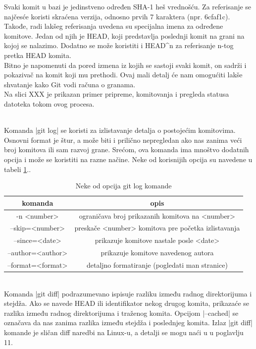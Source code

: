 \documentclass[a4paper]{article}
\begin{document}
{\begin{description}
Svaki komit u bazi je jedinstveno određen SHA-1 heš vrednošću. Za referisanje se najčesće koristi skraćena verzija, odnosno prvih 7 karaktera (npr. 6cfaf1c).
Takođe, radi lakšeg referisanja uvedena su specijalna imena za određene komitove. Jedan od njih je HEAD, koji predstavlja poslednji komit na grani na kojoj se nalazimo. Dodatno se može koristiti i HEAD\^{}n za referisanje n-tog pretka HEAD komita.\\

Bitno je napomenuti da pored izmena iz kojih se sastoji svaki komit, on sadrži i pokazivač na komit koji mu prethodi. Ovaj mali detalj će nam omogućiti lakše shvatanje kako Git vodi računa o granama.\\
Na slici XXX je prikazan primer pripreme, komitovanja i pregleda statusa datoteka tokom ovog procesa.

\item[git log] \hfill \\
\label{log}
Komanda |git log| se koristi za izlistavanje detalja o postojećim komitovima. Osnovni format je štur, a može biti i prilično nepregledan ako nas zanima veći broj komitova ili sam razvoj grane. Srećom, ova komanda ima mnoštvo dodatnih opcija i može se koristiti na razne načine. Neke od korisnijih opcija su navedene u tabeli \ref{tab:tabela1}.. 

\begin{table}[h!]
\begin{center}


\begin{tabular}{cc} \hline
komanda & opis\\ \hline
-n <number> & ograničava broj prikazanih komitova na <number> \\
--skip=<number> & preskače <number> komitova pre početka izlistavanja \\
--since=<date> & prikazuje komitove nastale posle <date> \\
--author=<author> & prikazuje komitove navedenog autora \\
--format=<format> & detaljno formatiranje (pogledati man stranice)
\end{tabular}
\caption{Neke od opcija git log komande}
\end{center}
\label{tab:tabela1}

\end{table}


\item[git diff] \hfill \\
\label{subsec:git_diff}
Komanda |git diff| podrazumevano ispisuje razliku između radnog direktorijuma i stejdža. 
Ako se navede HEAD ili identifikator nekog drugog komita, prikazaće se razlika između radnog direktorijuma i traženog komita. Opcijom |--cached| se označava da nas zanima razlika između stejdža i poslednjeg komita.
Izlaz |git diff| komande je sličan diff naredbi na Linux-u, a detalji se mogu naći u \cite{pocketguide} u poglavlju 11.



\end{description}}
\end{document}
